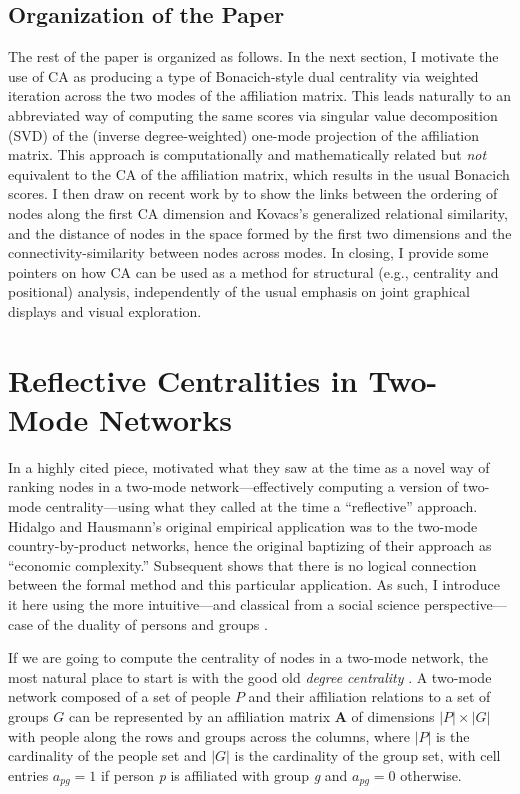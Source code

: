 \documentclass[a4paper,fleqn]{cas-sc}
\begin{document}
\subsection{Organization of the Paper}
The rest of the paper is organized as follows. In the next section, I motivate the use of CA as producing a type of Bonacich-style dual centrality via weighted iteration across the two modes of the affiliation matrix. This leads naturally to an abbreviated way of computing the same scores via singular value decomposition (SVD) of the (inverse degree-weighted) one-mode projection of the affiliation matrix. This approach is computationally and mathematically related but \textit{not} equivalent to the CA of the affiliation matrix, which results in the usual Bonacich scores. I then draw on recent work by \citet{van2021correspondence} to show the links between the ordering of nodes along the first CA dimension and Kovacs's generalized relational similarity, and the distance of nodes in the space formed by the first two dimensions and the connectivity-similarity between nodes across modes. In closing, I provide some pointers on how CA can be used as a method for structural (e.g., centrality and positional) analysis, independently of the usual emphasis on joint graphical displays and visual exploration. 

\section{Reflective Centralities in Two-Mode Networks}
In a highly cited piece, \citet{hidalgo2009building} motivated what they saw at the time as a novel way of ranking nodes in a two-mode network---effectively computing a version of two-mode centrality---using what they called at the time a ``reflective'' approach. Hidalgo and Hausmann's original empirical application was to the two-mode country-by-product networks, hence the original baptizing of their approach as ``economic complexity.'' Subsequent shows that there is no logical connection between the formal method and this particular application. As such, I introduce it here using the more intuitive---and classical from a social science perspective---case of the duality of persons and groups \citep{breiger1974duality}. 

If we are going to compute the centrality of nodes in a two-mode network, the most natural place to start is with the good old \textit{degree centrality} \citep{faust1997centrality}. A two-mode network composed of a set of people $P$ and their affiliation relations to a set of groups $G$ can be represented by an affiliation matrix $\mathbf{A}$ of dimensions $|P| \times |G|$ with people along the rows and groups across the columns, where $|P|$ is the cardinality of the people set and $|G|$ is the cardinality of the group set, with cell entries $a_{pg}= 1$ if person \textit{p} is affiliated with group \textit{g} and $a_{pg}= 0$ otherwise. 
\end{document}
